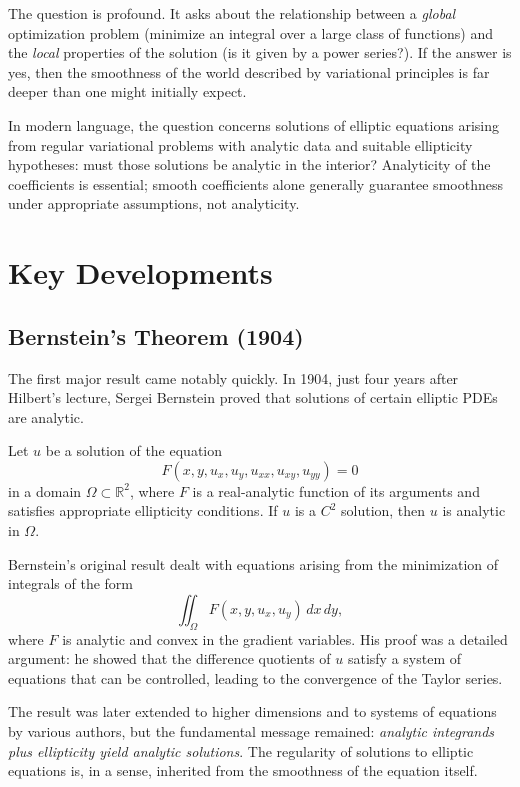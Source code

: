 The question is profound. It asks about the relationship between a \emph{global} optimization problem (minimize an integral over a large class of functions) and the \emph{local} properties of the solution (is it given by a power series?). If the answer is yes, then the smoothness of the world described by variational principles is far deeper than one might initially expect.

In modern language, the question concerns solutions of elliptic equations arising from regular variational problems with analytic data and suitable ellipticity hypotheses: must those solutions be analytic in the interior? Analyticity of the coefficients is essential; smooth coefficients alone generally guarantee smoothness under appropriate assumptions, not analyticity.

\section{Key Developments}

\subsection{Bernstein's Theorem (1904)}

The first major result came notably quickly. In 1904, just four years after Hilbert's lecture, Sergei Bernstein proved that solutions of certain elliptic PDEs are analytic.

\begin{theorem}[Bernstein, 1904]\label{thm:bernstein}
Let $u$ be a solution of the equation
\[
    F(x, y, u_x, u_y, u_{xx}, u_{xy}, u_{yy}) = 0
\]
in a domain $\Omega \subset \mathbb{R}^2$, where $F$ is a real-analytic function of its arguments and satisfies appropriate ellipticity conditions. If $u$ is a $C^2$ solution, then $u$ is analytic in $\Omega$.
\end{theorem}

Bernstein's original result dealt with equations arising from the minimization of integrals of the form
\[
    \iint_\Omega F(x, y, u_x, u_y) \, dx \, dy,
\]
where $F$ is analytic and convex in the gradient variables. His proof was a detailed argument: he showed that the difference quotients of $u$ satisfy a system of equations that can be controlled, leading to the convergence of the Taylor series.

The result was later extended to higher dimensions and to systems of equations by various authors, but the fundamental message remained: \emph{analytic integrands plus ellipticity yield analytic solutions}. The regularity of solutions to elliptic equations is, in a sense, inherited from the smoothness of the equation itself.

